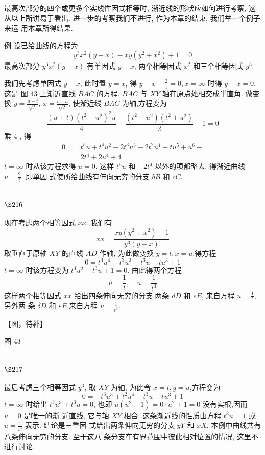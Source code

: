 最高次部分的四个或更多个实线性因式相等时, 渐近线的形状应如何进行考察, 这 从以上所讲易于看出. 进一步的考察我们不进行, 作为本章的结束, 我们举一个例子来运 用本章所得结果.

例 设已给曲线的方程为
\[
y^{3} x^{2}(y-x)-x y\left(y^{2}+x^{2}\right)+1=0
\]
最高次部分 $y^{3} x^{2}(y-x)$ 有单因式 $y-x$, 两个相等因式 $x^{2}$ 和三个相等因式 $y^{3}$.

我们先考虑单因式 $y-x$, 此时置 $y=x$, 得 $y-x-\frac{2}{x}=0, x=\infty$ 时得 $y-x=0$. 这是 图 43 上渐近直线 $B A C$ 的方程. $B A C$ 与 $X Y$ 轴在原点处相交成半直角. 做变换 $y=\frac{u+t}{\sqrt{2}}$, $x=\frac{t-u}{\sqrt{2}}$, 使渐近线 $B A C$ 为轴,方程变为
\[
\frac{(u+t)\left(t^{2}-u^{2}\right)^{2} u}{4}-\frac{\left(t^{2}-u^{2}\right)\left(t^{2}+u^{2}\right)}{2}+1=0
\]
乘 4 , 得
\[
\begin{aligned}
0= & t^{5} u+t^{4} u^{2}-2 t^{3} u^{3}-2 t^{2} u^{4}+t u^{5}+u^{6}- \\
& 2 t^{4}+2 u^{4}+4
\end{aligned}
\]
$t=\infty$ 时从该方程求得 $u=0$, 这样 $t^{5} u$ 和 $-2 t^{4}$ 以外的项都略去, 得渐近曲线 $u=\frac{2}{t}$. 即单因 式使所给曲线有伸向无穷的分支 $b B$ 和 $c C$.

\section{$\S 216$}

现在考虑两个相等因式 $x x$. 我们有
\[
x x=\frac{x y\left(y^{2}+x^{2}\right)-1}{y^{3}(y-x)}
\]
取垂直于原轴 $X Y$ 的直线 $A D$ 作轴, 为此做变换 $y=t, x=u$,得方程
\[
0=t^{4} u^{4}-t^{3} u^{3}+t^{3} u-t u^{3}+1
\]
$t=\infty$ 时该方程变为 $t^{4} u^{2}-t^{3} u+1=0$. 由此得两个方程
\[
u=\frac{1}{t}, \quad u=\frac{1}{t^{3}}
\]
这样两个相等因式 $x x$ 给出四条伸向无穷的分支,两条 $d D$ 和 $e E$, 来自方程 $u=\frac{1}{t}$, 另外两 条 $\delta D$ 和 $\varepsilon E$,来自方程 $u=\frac{1}{t^{3}}$.


【图，待补】

图 43

\section{$\S 217$}

最后考虑三个相等因式 $y^{3}$, 取 $X Y$ 为轴, 为此令 $x=t, y=u$,方程变为
\[
0=-t^{3} u^{3}+t^{2} u^{4}-t^{3} u-t u^{3}+1
\]
$t=\infty$ 时给出 $t^{3} u^{3}+t^{3} u=0$, 也即 $u\left(u^{2}+1\right)=0 \cdot u^{2}+1=0$ 没有实根,因而 $u=0$ 是唯一的渐 近直线, 它与轴 $X Y$ 相合. 这条渐近线的性质由方程 $t^{3} u=1$ 或 $u=\frac{1}{t^{3}}$ 表示. 结论是三重因 式给出两条伸向无穷的分支 $y Y$ 和 $x X$. 本例中曲线共有八条伸向无穷的分支. 至于这八 条分支在有界范围中彼此相对位置的情况, 这里不进行讨论. 

